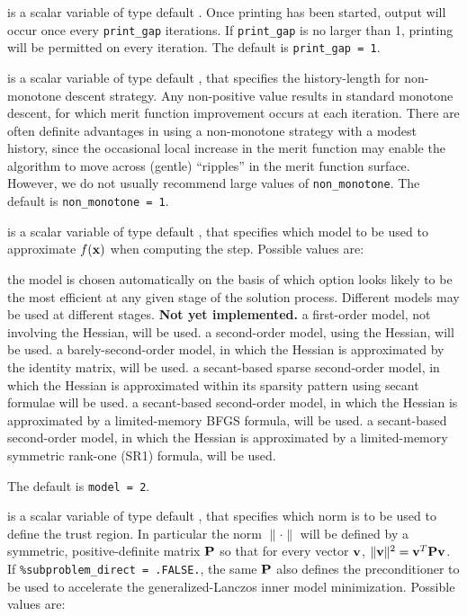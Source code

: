 \documentclass{galahad}
\begin{document}
\begin{description}
 is a scalar variable of type default \integer.
Once printing has been started, output will occur once every
{\tt print\_gap} iterations. If {\tt print\_gap} is no larger than 1,
printing will be permitted on every iteration.
The default is {\tt print\_gap = 1}.

 is a scalar variable of type default \integer, that
specifies the history-length for non-monotone descent strategy.
Any non-positive value results in standard monotone descent, for which
merit function improvement occurs at each iteration. There are often
definite advantages in using a non-monotone strategy with a modest history,
since the occasional local increase in the merit function may
enable the algorithm to move across (gentle) ``ripples'' in
the merit function surface.
However, we do not usually recommend large values of {\tt non\_monotone}.
The default is {\tt non\_monotone = 1}.

 is a scalar variable of type default \integer, that specifies
which model to be used to approximate $f({\mathbf{x}})$ when computing the step.
Possible values are:

\begin{description}
 the model is chosen automatically on the basis of which option looks
        likely to be the most efficient at any given stage of the solution
        process. Different models may be used at different stages.
        {\bf Not yet implemented.}
 a first-order model, not involving the Hessian, will be used.
 a second-order model, using the Hessian, will be used.
 a barely-second-order model, in which the Hessian is approximated
        by the identity matrix, will be used.
 a secant-based sparse second-order model, in which the Hessian is
        approximated within its sparsity pattern using secant formulae will
        be used.
 a secant-based second-order model, in which the Hessian is approximated
        by a limited-memory BFGS formula, will be used.
 a secant-based second-order model, in which the Hessian is approximated
        by a limited-memory symmetric rank-one (SR1) formula, will be used.
\end{description}
The default is {\tt model = 2}.

 is a scalar variable of type default \integer,
that specifies which norm is to be used to define the trust region.
In particular the norm $\|\cdot\|$ will be defined by a symmetric,
positive-definite matrix ${\mathbf{P}}$ so that for every vector ${\mathbf{v}}$,
$\|{\mathbf{v}}\|^2 = {\mathbf{v}}^T {\mathbf{P}} {\mathbf{v}}$.
If {\tt \%subproblem\_direct = .FALSE.}, the same ${\mathbf{P}}$ also defines the
preconditioner to be used to accelerate the generalized-Lanczos
inner model minimization.  Possible values are:


\end{description}
\end{document}
